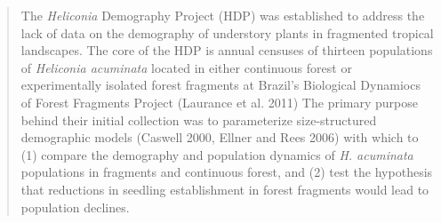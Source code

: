 \documentclass[
  12pt,
  man, donotrepeattitle,floatsintext]{apa6}
\begin{document}
\begin{quote}
The \emph{Heliconia} Demography Project (HDP) was established to address the lack of data on the demography of understory plants in fragmented tropical landscapes. The core of the HDP is annual censuses of thirteen populations of \emph{Heliconia acuminata} located in either continuous forest or experimentally isolated forest fragments at Brazil's Biological Dynamiocs of Forest Fragments Project (Laurance et al. 2011) The primary purpose behind their initial collection was to parameterize size-structured demographic models (Caswell 2000, Ellner and Rees 2006) with which to (1) compare the demography and population dynamics of \emph{H. acuminata} populations in fragments and continuous forest, and (2) test the hypothesis that reductions in seedling establishment in forest fragments would lead to population declines.
\end{quote}
\end{document}
